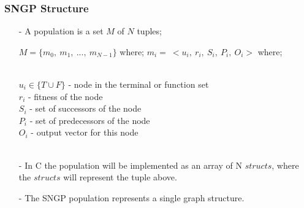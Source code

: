 \documentclass{beamer}
\begin{document}
\begin{frame}
\begin{columns}[T]
\begin{column}{0.35\textwidth}
\begin{figure}[H]
{}
\end{figure}
\end{column}
\end{columns}

\end{frame}

\begin{frame}
\frametitle{SNGP Structure}
\begin{itemize}
\item[-]A population is a set $M$ of $N$ tuples;
\begin{center}
$M = \{m_0,\ m_1,\ ...,\ m_{N-1}\}$ where; $m_i = \ <u_i,\ r_i,\ S_i,\ P_i,\ O_i>$ where;\\~\\
\end{center}
$u_i \in \{T \cup F\}$ - node in the terminal or function set\\
$r_i$ - fitness of the node\\
$S_i$ - set of successors of the node\\
$P_i$ - set of predecessors of the node\\
$O_i$ - output vector for this node\\~\\
\item[-]In C the population will be implemented as an array of N $structs$, where the $structs$ will represent the tuple above.
\item[-]The SNGP population represents a single graph structure.


\end{itemize}
\end{frame}
\end{document}
